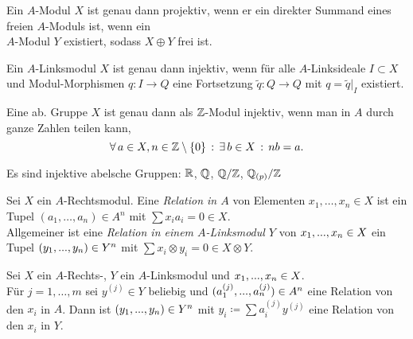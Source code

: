 \documentclass{cheat-sheet}
\begin{document}
\begin{lem}
  Ein $A$-Modul $X$ ist genau dann projektiv, wenn er ein direkter Summand eines freien $A$-Moduls ist, \dh{} wenn ein \\
  $A$-Modul $Y$ existiert, sodass $X \oplus Y$ frei ist.
\end{lem}

\begin{lem}
  Ein $A$-Linksmodul $X$ ist genau dann injektiv, wenn für alle $A$-Linksideale $I \subset X$ und Modul-Morphismen $q : I \to Q$ eine Fortsetzung $\tilde{q} : Q \to Q$ mit $q = \tilde{q}|_I$ existiert.
\end{lem}

\begin{lem}
  Eine ab. Gruppe $X$ ist genau dann als $\mathbb{Z}$-Modul injektiv, wenn man in $A$ durch ganze Zahlen teilen kann, \dh{}
  \[ \forall \, {a \in X, n \in \mathbb{Z} \setminus \{ 0 \}} \,:\, \exists \, {b \in X} \,:\, nb = a. \]
\end{lem}

\begin{bspe}
  Es sind injektive abelsche Gruppen: $\mathbb{R}$, $\mathbb{Q}$, $\mathbb{Q}/\mathbb{Z}$, $\mathbb{Q}_{(p)}/\mathbb{Z}$
\end{bspe}

\begin{defn}
  Sei $X$ ein $A$-Rechtsmodul. Eine \emph{Relation in $A$} von Elementen $x_1, \ldots, x_n \in X$ ist ein Tupel $(a_1, \ldots, a_n) \in A^n$ mit $\sum x_i a_i = 0 \in X$. \\
  Allgemeiner ist eine \emph{Relation in einem $A$-Linksmodul $Y$} von $x_1, ..., x_n \in X$ ein Tupel $(y_1, ..., y_n) \in Y^n$ mit $\sum x_i \otimes y_i \!=\! 0 \in X \!\otimes\! Y$.
\end{defn}

\begin{bem}
  Sei $X$ ein $A$-Rechts-, $Y$ ein $A$-Linksmodul und $x_1, ..., x_n \in X$. \\
  Für $j = 1, \ldots, m$ sei $y^{(j)} \in Y$ beliebig und $(a_1^{(j)}, ..., a_n^{(j)}) \in A^n$ eine Relation von den $x_i$ in $A$.
  Dann ist $(y_1, ..., y_n) \in Y^n$ mit $y_i \coloneqq \sum a_i^{(j)} y^{(j)}$ eine Relation von den $x_i$ in $Y$.
\end{bem}
\end{document}
